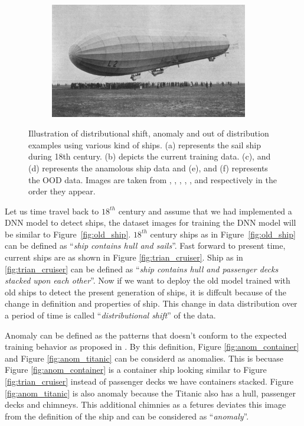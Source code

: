 \begin{figure}[h!]
\begin{subfigure}{0.333\textwidth}
        \centering
        \includegraphics[height=0.15\textheight,width=0.95\textwidth]{images/intro_ood_anomaly/ood_airship.jpg}
        \caption{}
        \label{fig:ood_airship}
    \end{subfigure}
    \caption{Illustration of distributional shift, anomaly and out of distribution examples using various kind of ships. (a) represents the sail ship during 18th century. (b) depicts the current training data.
    (c), and (d) represents the anamolous ship data and (e), and (f) represents the OOD data. Images are taken from \cite{old_ship}, \cite{train_cruiser}, \cite{container},
    \cite{titanic}, \cite{submarine}, and \cite{airship} respectively in the order they appear.}
\end{figure}

Let us time travel back to $18^{th}$ century and assume that we had implemented a DNN model to detect ships, the dataset images for training the DNN model will be similar to Figure~\ref{fig:old_ship}.
$18^{th}$ century ships as in Figure~\ref{fig:old_ship} can be defined as ``\textit{ship contains hull and sails}''.
Fast forward to present time, current ships are as shown in Figure \ref{fig:trian_cruiser}.
Ship as in \ref{fig:trian_cruiser} can be defined as ``\textit{ship contains hull and passenger decks stacked upon each other}''.
Now if we want to deploy the old model trained with old ships to detect the present generation of ships, it is diffcult because of the change in definition and properties of ship. 
This change in data distribution over a period of time is called ``\textit{distributional shift}'' of the data.

Anomaly can be defined as the patterns that doesn't conform to the expected training behavior as proposed in \cite{anomaly_sec1_1}.
By this definition, Figure \ref{fig:anom_container} and Figure \ref{fig:anom_titanic} can be considerd as anomalies.
This is becuase Figure \ref{fig:anom_container} is a container ship looking similar to Figure \ref{fig:trian_cruiser} instead of passenger decks we have containers stacked.
Figure \ref{fig:anom_titanic} is also anomaly because the Titanic also has a hull, passenger decks and chimneys. 
This additional chimnies as a fetures deviates this image from the definition of the ship and can be considered as ``\textit{anomaly}''.

